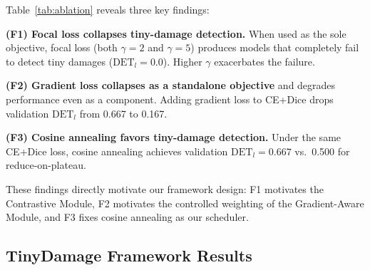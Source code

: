 \documentclass[10pt,twocolumn]{article}
\begin{document}
\begin{table}[t]
\centering
\caption{Optimization ablation on U-Net (CarDD). Best values in \textbf{bold}. Configurations marked with $\dagger$ collapse to zero tiny-damage detection.}
\label{tab:ablation}
\end{table}

Table~\ref{tab:ablation} reveals three key findings:

\textbf{(F1) Focal loss collapses tiny-damage detection.} When used as the sole objective, focal loss (both $\gamma=2$ and $\gamma=5$) produces models that completely fail to detect tiny damages ($\text{DET}_l = 0.0$). Higher $\gamma$ exacerbates the failure.

\textbf{(F2) Gradient loss collapses as a standalone objective} and degrades performance even as a component. Adding gradient loss to CE+Dice drops validation $\text{DET}_l$ from 0.667 to 0.167.

\textbf{(F3) Cosine annealing favors tiny-damage detection.} Under the same CE+Dice loss, cosine annealing achieves validation $\text{DET}_l = 0.667$ vs.\ 0.500 for reduce-on-plateau.

These findings directly motivate our framework design: F1 motivates the Contrastive Module, F2 motivates the controlled weighting of the Gradient-Aware Module, and F3 fixes cosine annealing as our scheduler.

\subsection{TinyDamage Framework Results}
\end{document}
